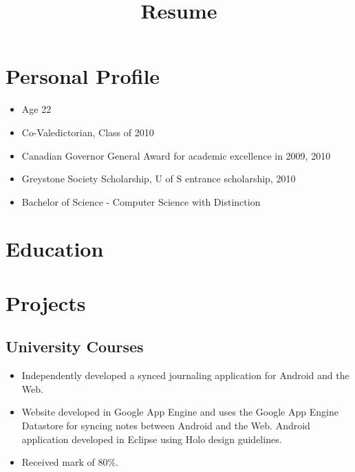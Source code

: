 \documentclass[11pt,letterpaper,sans]{moderncv}        %
\title{Resume}                               %
\begin{document}
\makecvtitle
\vspace*{-1cm} %

\section{Personal Profile}
\cvitem{}
{
  \begin{itemize}
    \item Age 22
    \item Co-Valedictorian, Class of 2010
    \item Canadian Governor General Award for academic excellence in 2009, 2010
    \item Greystone Society Scholarship, U of S entrance scholarship, 2010
    \item Bachelor of Science - Computer Science with Distinction
  \end{itemize}
}


\section{Education}


\section{Projects}
\subsection{University Courses}
{
  \begin{itemize}
    \item Independently developed a synced journaling application for Android and the Web.
    \item Website developed in Google App Engine and uses the Google App Engine Datastore for syncing notes between Android and the Web. Android application developed in Eclipse using Holo design guidelines.
    \item Received mark of 80\%.
  \end{itemize}
}
\end{document}
